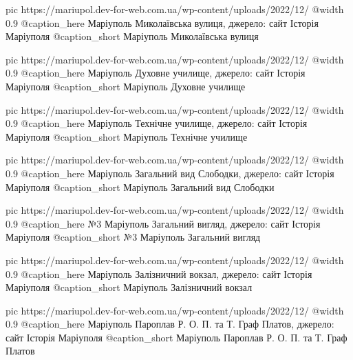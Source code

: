   pic https://mariupol.dev-for-web.com.ua/wp-content/uploads/2022/12/%
  @width 0.9
  @caption_here Маріуполь Миколаївська вулиця, джерело: сайт Історія Маріуполя
  @caption_short Маріуполь Миколаївська вулиця

  pic https://mariupol.dev-for-web.com.ua/wp-content/uploads/2022/12/%
  @width 0.9
  @caption_here Маріуполь Духовне училище, джерело: сайт Історія Маріуполя
  @caption_short Маріуполь Духовне училище

  pic https://mariupol.dev-for-web.com.ua/wp-content/uploads/2022/12/%
  @width 0.9
  @caption_here Маріуполь Технічне училище, джерело: сайт Історія Маріуполя
  @caption_short Маріуполь Технічне училище

  pic https://mariupol.dev-for-web.com.ua/wp-content/uploads/2022/12/%
  @width 0.9
  @caption_here Маріуполь Загальний вид Слободки, джерело: сайт Історія Маріуполя
  @caption_short Маріуполь Загальний вид Слободки

  pic https://mariupol.dev-for-web.com.ua/wp-content/uploads/2022/12/%
  @width 0.9
  @caption_here №3 Маріуполь Загальний вигляд, джерело: сайт Історія Маріуполя
  @caption_short №3 Маріуполь Загальний вигляд

  pic https://mariupol.dev-for-web.com.ua/wp-content/uploads/2022/12/%
  @width 0.9
  @caption_here Маріуполь Залізничний вокзал, джерело: сайт Історія Маріуполя
  @caption_short Маріуполь Залізничний вокзал

  pic https://mariupol.dev-for-web.com.ua/wp-content/uploads/2022/12/%
  @width 0.9
  @caption_here Маріуполь Пароплав Р. О. П. та Т. Граф Платов, джерело: сайт Історія Маріуполя
  @caption_short Маріуполь Пароплав Р. О. П. та Т. Граф Платов

